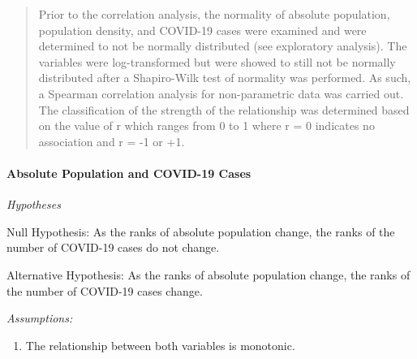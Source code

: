\documentclass[
  12pt,
]{article}
\newenvironment{Shaded}{\begin{snugshade}}{\end{snugshade}}
\newcommand{\AttributeTok}[1]{\textcolor[rgb]{0.77,0.63,0.00}{#1}}
\newcommand{\CommentTok}[1]{\textcolor[rgb]{0.56,0.35,0.01}{\textit{#1}}}
\newcommand{\FunctionTok}[1]{\textcolor[rgb]{0.00,0.00,0.00}{#1}}
\newcommand{\NormalTok}[1]{#1}
\newcommand{\OtherTok}[1]{\textcolor[rgb]{0.56,0.35,0.01}{#1}}
\newcommand{\SpecialCharTok}[1]{\textcolor[rgb]{0.00,0.00,0.00}{#1}}
\newcommand{\StringTok}[1]{\textcolor[rgb]{0.31,0.60,0.02}{#1}}
\providecommand{\tightlist}{%
  \setlength{\itemsep}{0pt}\setlength{\parskip}{0pt}}
\begin{document}
\begin{quote}
Prior to the correlation analysis, the normality of absolute population,
population density, and COVID-19 cases were examined and were determined
to not be normally distributed (see exploratory analysis). The variables
were log-transformed but were showed to still not be normally
distributed after a Shapiro-Wilk test of normality was performed. As
such, a Spearman correlation analysis for non-parametric data was
carried out. The classification of the strength of the relationship was
determined based on the value of r which ranges from 0 to 1 where r = 0
indicates no association and r = -1 or +1.
\end{quote}

\hypertarget{absolute-population-and-covid-19-cases}{%
\paragraph{Absolute Population and COVID-19
Cases}\label{absolute-population-and-covid-19-cases}}

\emph{Hypotheses}

Null Hypothesis: As the ranks of absolute population change, the ranks
of the number of COVID-19 cases do not change.

Alternative Hypothesis: As the ranks of absolute population change, the
ranks of the number of COVID-19 cases change.

\emph{Assumptions:}

\begin{enumerate}
\def\labelenumi{\arabic{enumi}.}
\tightlist
\item
  The relationship between both variables is monotonic.
\end{enumerate}

\begin{Shaded}
\end{Shaded}
\end{document}
